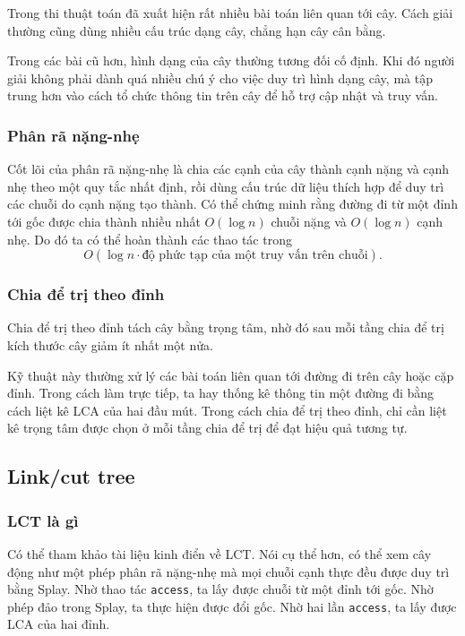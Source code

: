 \documentclass[11pt]{article}
\begin{document}
Trong thi thuật toán đã xuất hiện rất nhiều bài toán liên quan tới cây. Cách giải
thường cũng dùng nhiều cấu trúc dạng cây, chẳng hạn cây cân bằng.

Trong các bài cũ hơn, hình dạng của cây thường tương đối cố định. Khi đó người
giải không phải dành quá nhiều chú ý cho việc duy trì hình dạng cây, mà tập
trung hơn vào cách tổ chức thông tin trên cây để hỗ trợ cập nhật và truy vấn.

\subsubsection{Phân rã nặng-nhẹ}

Cốt lõi của phân rã nặng-nhẹ là chia các cạnh của cây thành cạnh nặng và cạnh
nhẹ theo một quy tắc nhất định, rồi dùng cấu trúc dữ liệu thích hợp để duy trì
các chuỗi do cạnh nặng tạo thành. Có thể chứng minh rằng đường đi từ một đỉnh
tới gốc được chia thành nhiều nhất \(O(\log n)\) chuỗi nặng và \(O(\log n)\)
cạnh nhẹ. Do đó ta có thể hoàn thành các thao tác trong
\[
  O(\log n\cdot \text{độ phức tạp của một truy vấn trên chuỗi}).
\]

\subsubsection{Chia để trị theo đỉnh}

Chia để trị theo đỉnh tách cây bằng trọng tâm, nhờ đó sau mỗi tầng chia để trị
kích thước cây giảm ít nhất một nửa.

Kỹ thuật này thường xử lý các bài toán liên quan tới đường đi trên cây hoặc cặp
đỉnh. Trong cách làm trực tiếp, ta hay thống kê thông tin một đường đi bằng cách
liệt kê LCA của hai đầu mút. Trong cách chia để trị theo đỉnh, chỉ cần liệt kê
trọng tâm được chọn ở mỗi tầng chia để trị để đạt hiệu quả tương tự.

\subsection{Link/cut tree}

\subsubsection{LCT là gì}

Có thể tham khảo tài liệu kinh điển về LCT. Nói cụ thể hơn, có thể xem cây động
như một phép phân rã nặng-nhẹ mà mọi chuỗi cạnh thực đều được duy trì bằng
Splay. Nhờ thao tác \texttt{access}, ta lấy được chuỗi từ một đỉnh tới gốc. Nhờ
phép đảo trong Splay, ta thực hiện được đổi gốc. Nhờ hai lần \texttt{access}, ta
lấy được LCA của hai đỉnh.
\end{document}
